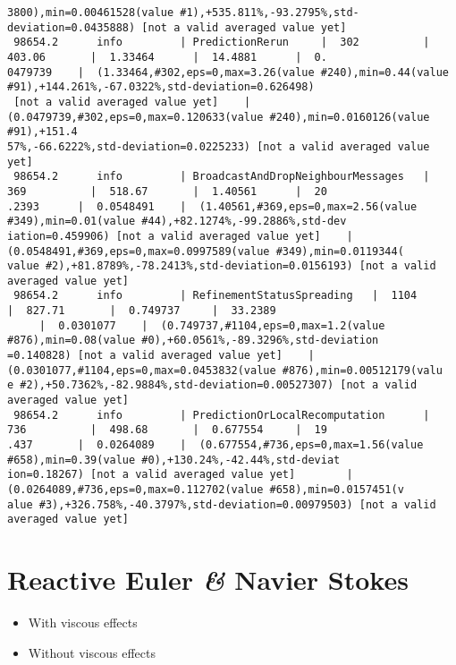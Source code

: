\begin{verbatim}
3800),min=0.00461528(value #1),+535.811%,-93.2795%,std-deviation=0.0435888) [not a valid averaged value yet]
 98654.2      info         | PredictionRerun     |  302          |  403.06       |  1.33464      |  14.4881      |  0.
0479739    |  (1.33464,#302,eps=0,max=3.26(value #240),min=0.44(value #91),+144.261%,-67.0322%,std-deviation=0.626498)
 [not a valid averaged value yet]    |  (0.0479739,#302,eps=0,max=0.120633(value #240),min=0.0160126(value #91),+151.4
57%,-66.6222%,std-deviation=0.0225233) [not a valid averaged value yet]
 98654.2      info         | BroadcastAndDropNeighbourMessages   |  369          |  518.67       |  1.40561      |  20
.2393      |  0.0548491    |  (1.40561,#369,eps=0,max=2.56(value #349),min=0.01(value #44),+82.1274%,-99.2886%,std-dev
iation=0.459906) [not a valid averaged value yet]    |  (0.0548491,#369,eps=0,max=0.0997589(value #349),min=0.0119344(
value #2),+81.8789%,-78.2413%,std-deviation=0.0156193) [not a valid averaged value yet]
 98654.2      info         | RefinementStatusSpreading   |  1104         |  827.71       |  0.749737     |  33.2389 
     |  0.0301077    |  (0.749737,#1104,eps=0,max=1.2(value #876),min=0.08(value #0),+60.0561%,-89.3296%,std-deviation
=0.140828) [not a valid averaged value yet]    |  (0.0301077,#1104,eps=0,max=0.0453832(value #876),min=0.00512179(valu
e #2),+50.7362%,-82.9884%,std-deviation=0.00527307) [not a valid averaged value yet]
 98654.2      info         | PredictionOrLocalRecomputation      |  736          |  498.68       |  0.677554     |  19
.437       |  0.0264089    |  (0.677554,#736,eps=0,max=1.56(value #658),min=0.39(value #0),+130.24%,-42.44%,std-deviat
ion=0.18267) [not a valid averaged value yet]        |  (0.0264089,#736,eps=0,max=0.112702(value #658),min=0.0157451(v
alue #3),+326.758%,-40.3797%,std-deviation=0.00979503) [not a valid averaged value yet]
\end{verbatim}

\section{Reactive Euler \textit{\&} Navier Stokes}
\begin{itemize}
\item With viscous effects
\item Without viscous effects  
\end{itemize}
